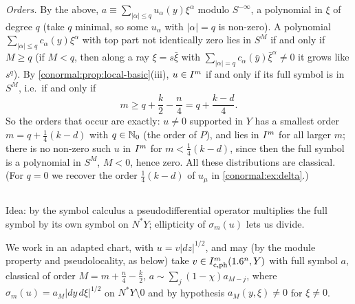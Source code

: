 \emph{Orders.} By the above, $a\equiv\sum_{|\alpha|\le q}u_\alpha(y)\xi^\alpha$ modulo
$S^{-\infty}$, a polynomial in $\xi$ of degree $q$ (take $q$ minimal, so some $u_\alpha$
with $|\alpha|=q$ is non-zero). A polynomial $\sum_{|\alpha|\le q}c_\alpha(y)\xi^\alpha$ with
top part not identically zero lies in $S^M$ if and only if $M\ge q$ (if $M<q$, then along a
ray $\xi=s\bar\xi$ with $\sum_{|\alpha|=q}c_\alpha(\bar y)\bar\xi^\alpha\ne0$ it grows like
$s^q$). By \cref{conormal:prop:local-basic}(iii), $u\in I^{m}$ if and only if its full symbol is
in $S^{M}$, i.e.\ if and only if
\begin{equation*}
m\ge q+\frac k2-\frac n4=q+\frac{k-d}4 .
\end{equation*}
So the orders that occur are exactly: $u\ne0$ supported in $Y$ has a smallest order
$m=q+\frac14(k-d)$ with $q\in\mathbb{N}_0$ (the order of $P$), and lies in $I^{m}$ for all larger $m$;
there is no non-zero such $u$ in $I^{m}$ for $m<\frac14(k-d)$, since then the full symbol is a
polynomial in $S^{M}$, $M<0$, hence zero. All these distributions are classical. (For $q=0$
we recover the order $\frac14(k-d)$ of $u_\mu$ in \cref{conormal:ex:delta}.)

\subsection*{}
Idea: by the symbol calculus a pseudodifferential operator multiplies the full symbol by its
own symbol on $N^*Y$; ellipticity of $\sigma_m(u)$ lets us divide.

We work in an adapted chart, with $u=v|dz|^{1/2}$, and may (by the module property and
pseudolocality, as below) take $v\in I^{m}_{\mathrm c,\mathrm{ph}}(1.6^n,Y)$ with full symbol $a$,
classical of order $M=m+\frac n4-\frac k2$, $a\sim\sum_j(1-\chi)a_{M-j}$, where
$\sigma_m(u)=a_M|dy\,d\xi|^{1/2}$ on $N^*Y\setminus0$ and by hypothesis $a_M(y,\xi)\ne0$ for
$\xi\ne0$.

